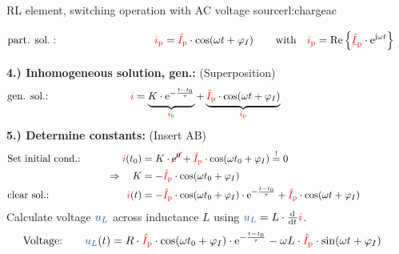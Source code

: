 {\begin{expl}{RL element, switching operation with AC voltage source}{rl:chargeac}
\begin{align*}
                &\text{part. sol.}:&&&
                    \eci{i_{\mathrm p}} &= \eci{\hat{I}_{\mathrm p}} \cdot \cos(\omega t + \varphi_I) &&&
                    &\text{with}\quad \eci{i_{\mathrm p}} = \Re\left\{\eci{\underline{\hat{I}}_{\mathrm p}} \cdot \mathrm{e}^{\mathrm{j}\omega t}\right\} \vphantom{\Bigg|}
            \\[-15pt]&\hphantom{R1oooooooooo}&&&\hphantom{L3ooooooooooo}&\hphantom{R3ooooooooooooooo}&&&&\hphantom{R5ooooooooooooooooooooooo}\nonumber%
        \end{align*}%
        \textbf{4.) Inhomogeneous solution, gen.:} (Superposition)%
        \begin{align*}
                &\text{gen. sol.:}&&&
                    \eci{i} &=
                    \underbrace{ \vphantom{\big|}
                        K \cdot \mathrm{e}^{-\frac{t-t_0}{\tau}}
                    }_{\eci{i_{\mathrm h}}}
                    +
                    \underbrace{ \vphantom{\big|}
                        \eci{\hat{I}_{\mathrm p}} \cdot \cos(\omega t + \varphi_I)
                    }_{\eci{i_{\mathrm p}}}&&&
            \\[-15pt]&\hphantom{R1oooooooooo}&&&\hphantom{L3oooooo}&\hphantom{R3ooooooooooooooooooooooooooooooooooooooooooo}&&&&\hphantom{R5}\nonumber%
        \end{align*}
        \textbf{5.) Determine constants:} (Insert AB)%
        \begin{align*}
            &\text{Set initial cond.:}&&&
                \eci{i}(t_0) &= K \cdot \redcancel{\mathrm{e}^0} + \eci{\hat{I}_{\mathrm p}} \cdot \cos(\omega t_0 + \varphi_I) \overset{!}{=} 0 \\
            &&&&
                \Rightarrow\quad K &= -\eci{\hat{I}_{\mathrm p}} \cdot \cos(\omega t_0 + \varphi_I) \\
            &\text{clear sol.:}&&&
                \eci{i}(t) &= -\eci{\hat{I}_{\mathrm p}} \cdot \cos(\omega t_0 + \varphi_I) \cdot \mathrm{e}^{-\frac{t-t_0}{\tau}} + \eci{\hat{I}_{\mathrm p}} \cdot \cos(\omega t + \varphi_I)
            \\[-15pt]&\hphantom{R1oooooooooo}&&&\hphantom{L3oooooo}&\hphantom{R3ooooooooooooooooooooooooooooooooooooooooooo}&&&&\hphantom{R5}\nonumber%
        \end{align*}
        Calculate voltage $\ecv{u_L}$ across inductance $L$ using $\ecv{u_L} = L \cdot \dt \eci{i}$.
        \begin{align*}
            &\text{Voltage:}&&&
                \ecv{u_L}(t) &= R \cdot \eci{\hat{I}_{\mathrm p}} \cdot \cos(\omega t_0 + \varphi_I) \cdot \mathrm{e}^{-\frac{t-t_0}{\tau}} - \omega L \cdot \eci{\hat{I}_{\mathrm p}} \cdot \sin(\omega t + \varphi_I)
        \end{align*}
    \end{expl}
}%

